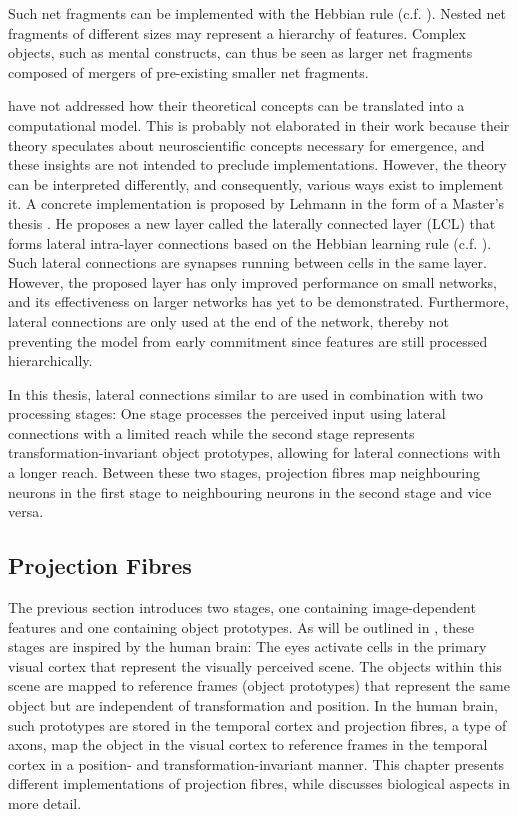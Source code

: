 Such net fragments can be implemented with the Hebbian rule (c.f. ).
Nested net fragments of different sizes may represent a hierarchy of features.
Complex objects, such as mental constructs, can thus be seen as larger net fragments composed of mergers of pre-existing smaller net fragments.

 have not addressed how their theoretical concepts can be translated into a computational model.
This is probably not elaborated in their work because their theory speculates about neuroscientific concepts necessary for emergence, and these insights are not intended to preclude implementations.
However, the theory can be interpreted differently, and consequently, various ways exist to implement it.
A concrete implementation is proposed by Lehmann in the form of a Master's thesis .
He proposes a new layer called the laterally connected layer (LCL) that forms lateral intra-layer connections based on the Hebbian learning rule (c.f. ).
Such lateral connections are synapses running between cells in the same layer.
However, the proposed layer has only improved performance on small networks, and its effectiveness on larger networks has yet to be demonstrated.
Furthermore, lateral connections are only used at the end of the network, thereby not preventing the model from early commitment since features are still processed hierarchically.

In this thesis, lateral connections similar to  are used in combination with two processing stages: One stage processes the perceived input using lateral connections with a limited reach while the second stage represents transformation-invariant object prototypes, allowing for lateral connections with a longer reach.
Between these two stages, projection fibres map neighbouring neurons in the first stage to neighbouring neurons in the second stage and vice versa.


\subsection{Projection Fibres}
The previous section introduces two stages, one containing image-dependent features and one containing object prototypes.
As will be outlined in , these stages are inspired by the human brain: The eyes activate cells in the primary visual cortex  that represent the visually perceived scene.
The objects within this scene are mapped to reference frames (object prototypes) that represent the same object but are independent of transformation and position.
In the human brain, such prototypes are stored in the temporal cortex  and projection fibres, a type of axons, map the object in the visual cortex to reference frames in the temporal cortex in a position- and transformation-invariant manner.
This chapter presents different implementations of projection fibres, while  discusses biological aspects in more detail. 

